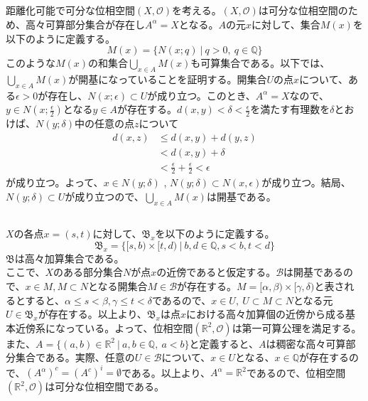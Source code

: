 \documentclass{jsarticle}
\begin{document}
\subsection{}
距離化可能で可分な位相空間$(X,\mathcal{O})$を考える。$(X,\mathcal{O})$は可分な位相空間のため、高々可算部分集合が存在し$A^\alpha=X$となる。$A$の元$x$に対して、集合$M(x)$を以下のように定義する。
\[M(x)=\{N(x;q)\ |\ q>0,\ q\in\mathbb{Q}\}\]
このような$M(x)$の和集合$\bigcup_{x\in A}M(x)$も可算集合である。以下では、$\bigcup_{x\in A}M(x)$が開基になっていることを証明する。開集合$U$の点$x$について、ある$\epsilon>0$が存在し、$N(x;\epsilon)\subset U$が成り立つ。このとき、$A^\alpha=X$なので、$y\in N(x;\frac{\epsilon}{2})$となる$y\in A$が存在する。$d(x,y)<\delta<\frac{\epsilon}{2}$を満たす有理数を$\delta$とおけば、$N(y;\delta)$中の任意の点$z$について
\begin{align*}
d(x,z)&\leq d(x,y)+d(y,z)\\
&<d(x,y)+\delta\\
&<\frac{\epsilon}{2}+\frac{\epsilon}{2}<\epsilon
\end{align*}
が成り立つ。よって、$x\in N(y;\delta)$ , $N(y;\delta)\subset N(x,\epsilon)$が成り立つ。結局、$N(y;\delta)\subset U$が成り立つので、$\bigcup_{x\in A}M(x)$は開基である。


\subsection{}
\subsubsection{}
$X$の各点$x=(s,t)$に対して、$\mathfrak{B}_x$を以下のように定義する。
\[\mathfrak{B}_x=\{[s,b)\times[t,d)\ |\ b,d\in\mathbb{Q}, s<b, t<d\}\]
$\mathfrak{B}$は高々加算集合である。\\
ここで、$X$のある部分集合$N$が点$x$の近傍であると仮定する。$\mathcal{B}$は開基であるので、$x\in M, M\subset N$となる開集合$M\in\mathcal{B}$が存在する。$M=[\alpha,\beta)\times[\gamma,\delta)$と表されるとすると、$\alpha\leq s<\beta,\gamma\leq t<\delta$であるので、$x\in U,\ U\subset M\subset N$となる元$U\in\mathfrak{B}_x$が存在する。以上より、$\mathfrak{B}_x$は点$x$における高々加算個の近傍から成る基本近傍系になっている。よって、位相空間$(\mathbb{R}^2, \mathcal{O})$は第一可算公理を満足する。\\
また、$A=\{(a,b)\in\mathbb{R}^2\ |\ a,b\in\mathbb{Q},\ a<b\}$と定義すると、$A$は稠密な高々可算部分集合である。実際、任意の$U\in\mathcal{B}$について、$x\in U$となる、$x\in \mathbb{Q}$が存在するので、$(A^\alpha)^c=(A^c)^i=\emptyset$である。以上より、$A^\alpha=\mathbb{R}^2$であるので、位相空間$(\mathbb{R}^2, \mathcal{O})$は可分な位相空間である。
\end{document}
